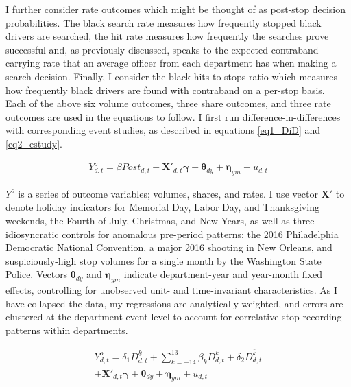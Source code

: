 \documentclass[12pt,a4paper]{article}
\begin{document}
I further consider rate outcomes which might be thought of as post-stop decision probabilities. The black search rate measures how frequently stopped black drivers are searched, the hit rate measures how frequently the searches prove successful and, as previously discussed, speaks to the expected contraband carrying rate that an average officer from each department has when making a search decision. Finally, I consider the black hits-to-stops ratio which measures how frequently black drivers are found with contraband on a per-stop basis. \\

Each of the above six volume outcomes, three share outcomes, and three rate outcomes are used in the equations to follow. I first run difference-in-differences with corresponding event studies, as described in equations \ref{eq1_DiD} and \ref{eq2_estudy}. 

\begin{center}
	
\end{center}

\begin{equation}
	\begin{split}
		Y^{o}_{d,t} = \beta Post_{d,t} + \boldsymbol{X'}_{d,t} \boldsymbol{\gamma} + \boldsymbol{\theta}_{dy} + \boldsymbol{\eta}_{ym} + u_{d,t} 
    		\label{eq1_DiD}
	\end{split}
\end{equation}

$Y^{o}$ is a series of outcome variables; volumes, shares, and rates. I use vector $\boldsymbol{X'}$ to denote holiday indicators for Memorial Day, Labor Day, and Thanksgiving weekends, the Fourth of July, Christmas, and New Years, as well as three idiosyncratic controls for anomalous pre-period patterns: the 2016 Philadelphia Democratic National Convention, a major 2016 shooting in New Orleans, and suspiciously-high stop volumes for a single month by the Washington State Police. Vectors $\boldsymbol{\theta}_{dy}$ and $\boldsymbol{\eta}_{ym}$ indicate department-year and year-month fixed effects, controlling for unobserved unit- and time-invariant characteristics. As I have collapsed the data, my regressions are analytically-weighted, and errors are clustered at the department-event level to account for correlative stop recording patterns within departments. 

\begin{equation}
	\begin{split}
		Y^{o}_{d,t} = \delta_{1} D^{\underline{k}}_{d,t} + \sum^{13}_{k=-14} \beta_{k}D^{k}_{d,t} + \delta_{2} D^{\bar{k}}_{d,t} \\ 
			+ \boldsymbol{X'}_{d,t} \boldsymbol{\gamma} + \boldsymbol{\theta}_{dy} + \boldsymbol{\eta}_{ym} + u_{d,t}
		\label{eq2_estudy}
	\end{split}
\end{equation}
\end{document}

